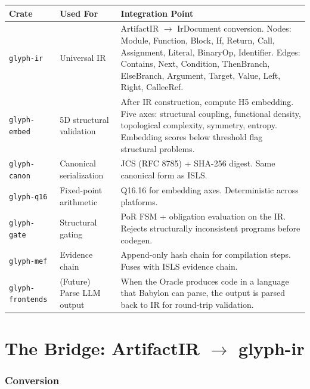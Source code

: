 \documentclass[11pt,a4paper,twoside]{article}
\theoremstyle{definition}
\theoremstyle{plain}
\theoremstyle{remark}
\newcommand{\ISLS}{\textsf{ISLS}}
\begin{document}
\begin{tabularx}{\textwidth}{l l X}
\toprule
\textbf{Crate} & \textbf{Used For} & \textbf{Integration Point} \\
\midrule
\texttt{glyph-ir} & Universal IR & ArtifactIR $\to$ IrDocument
  conversion. Nodes: Module, Function, Block, If, Return, Call,
  Assignment, Literal, BinaryOp, Identifier. Edges: Contains, Next,
  Condition, ThenBranch, ElseBranch, Argument, Target, Value, Left,
  Right, CalleeRef. \\
\texttt{glyph-embed} & 5D structural validation & After IR
  construction, compute H5 embedding. Five axes: structural coupling,
  functional density, topological complexity, symmetry, entropy.
  Embedding scores below threshold flag structural problems. \\
\texttt{glyph-canon} & Canonical serialization & JCS (RFC 8785) +
  SHA-256 digest. Same canonical form as \ISLS{}. \\
\texttt{glyph-q16} & Fixed-point arithmetic & Q16.16 for embedding
  axes. Deterministic across platforms. \\
\texttt{glyph-gate} & Structural gating & PoR FSM + obligation
  evaluation on the IR. Rejects structurally inconsistent programs
  before codegen. \\
\texttt{glyph-mef} & Evidence chain & Append-only hash chain for
  compilation steps. Fuses with \ISLS{} evidence chain. \\
\texttt{glyph-frontends} & (Future) Parse LLM output & When the
  Oracle produces code in a language that Babylon can parse, the
  output is parsed back to IR for round-trip validation. \\
\bottomrule
\end{tabularx}


\part{The Bridge: ArtifactIR $\to$ glyph-ir}\label{part:bridge}

\section{Conversion}\label{sec:convert}
\end{document}
